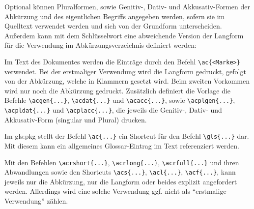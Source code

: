 Optional können Pluralformen, sowie Genitiv-, Dativ- und Akkusativ-Formen 
der Abkürzung und des eigentlichen Begriffs angegeben werden,
sofern sie im Quelltext verwendet werden und sich von der Grundform unterscheiden.
Außerdem kann mit dem Schlüsselwort 
eine abweichende Version der Langform für die Verwendung im Abkürzungsverzeichnis definiert werden:

\begin{latex}[caption={Definition einer Abkürzung mit Zusatzangaben},label={lst:AdvancedAcronymEntry}]
\end{latex}

Im Text des Dokumentes werden die Einträge durch den Befehl \lstinline|\ac{<Marke>}| verwendet.
Bei der erstmaliger Verwendung wird die Langform gedruckt, gefolgt von der Abkürzung, welche in Klammern gesetzt wird.
Beim zweiten Vorkommen wird nur noch die Abkürzung gedruckt.
Zusätzlich definiert die Vorlage die Befehle
\lstinline|\acgen{...}|, \lstinline|\acdat{...}| und \lstinline|\acacc{...}|, sowie
\lstinline|\acplgen{...}|, \lstinline|\acpldat{...}| und \lstinline|\acplacc{...}|,
die jeweils die Genitiv-, Dativ- und Akkusativ-Form (singular und Plural) drucken.

Im \gls{gls:pkg}  stellt der Befehl \lstinline|\ac{...}| ein Shortcut für den Befehl \lstinline|\gls{...}| dar.
Mit diesem kann ein allgemeines Glossar-Eintrag im Text referenziert werden.

Mit den Befehlen
\lstinline|\acrshort{...}|, \lstinline|\acrlong{...}|, \lstinline|\acrfull{...}|
und ihren Abwandlungen sowie den Shortcuts
\lstinline|\acs{...}|, \lstinline|\acl{...}|, \lstinline|\acf{...}|,
kann jeweils nur die Abkürzung, nur die Langform oder beides explizit angefordert werden.
Allerdings wird eine solche Verwendung ggf. nicht als \enquote{erstmalige Verwendung} zählen.

